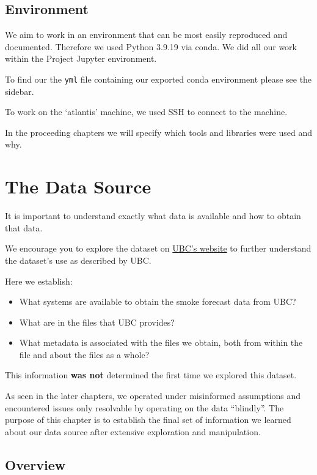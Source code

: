 \documentclass[
  letterpaper,
  DIV=11,
  numbers=noendperiod]{scrreprt}
\providecommand{\tightlist}{%
  \setlength{\itemsep}{0pt}\setlength{\parskip}{0pt}}\usepackage{longtable,booktabs,array}
\begin{document}
\section{Environment}\label{environment}

We aim to work in an environment that can be most easily reproduced and
documented. Therefore we used Python 3.9.19 via conda. We did all our
work within the Project Jupyter environment.

To find our the \texttt{yml} file containing our exported conda
environment please see the sidebar.

To work on the `atlantis' machine, we used SSH to connect to the
machine.

In the proceeding chapters we will specify which tools and libraries
were used and why.


\chapter{The Data Source}\label{sec-data-source}

It is important to understand exactly what data is available and how to
obtain that data.

We encourage you to explore the dataset on
\href{https://firesmoke.ca/forecasts/}{UBC's website} to further
understand the dataset's use as described by UBC.

Here we establish:

\begin{itemize}
\tightlist
\item
  What systems are available to obtain the smoke forecast data from UBC?
\item
  What are in the files that UBC provides?
\item
  What metadata is associated with the files we obtain, both from within
  the file and about the files as a whole?
\end{itemize}

This information \textbf{was not} determined the first time we explored
this dataset.

As seen in the later chapters, we operated under misinformed assumptions
and encountered issues only resolvable by operating on the data
``blindly''. The purpose of this chapter is to establish the final set
of information we learned about our data source after extensive
exploration and manipulation.

\section{Overview}\label{overview}
\end{document}
